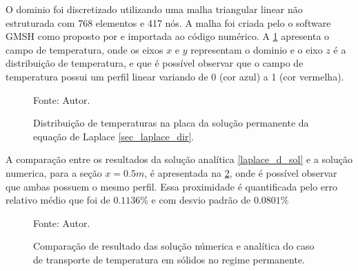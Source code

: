 O dominio foi discretizado utilizando uma malha triangular linear não estruturada com 768 elementos e 417 nós.
A malha foi criada pelo o software GMSH como proposto por \cite{gmsh} e importada ao código numérico.
A \ref{laplace_d_3d} apresenta o campo de temperatura, onde os eixos $x$ e $y$ representam o dominio e o eixo $z$ é a distribuição de temperatura, e que é possível observar que o campo de temperatura possui um perfil linear variando de 0 (cor azul) a 1 (cor vermelha).
\begin{figure}[H]
    \centering
     {\raggedleft \scriptsize Fonte: Autor.}
    \caption{Distribuição de temperaturas na placa da solução permanente da equação de Laplace \ref{sec_laplace_dir}.}
    \label{laplace_d_3d}
\end{figure}

A comparação entre os resultados da solução analítica \eqref{laplace_d_sol} e a solução numerica, para a seção $x=0.5m$, é apresentada na \ref{laplace_d_perm_comp}, onde é possível observar que ambas possuem o mesmo perfil.
Essa proximidade é quantificada pelo erro relativo médio que foi de $0.1136\%$ e com desvio padrão de $0.0801\%$
\begin{figure}[H]
    \centering
     {\raggedleft \scriptsize Fonte: Autor.}
    \caption{Comparação de resultado das solução númerica e analítica do caso de transporte de temperatura em sólidos no regime permanente.}
    \label{laplace_d_perm_comp}
\end{figure}


